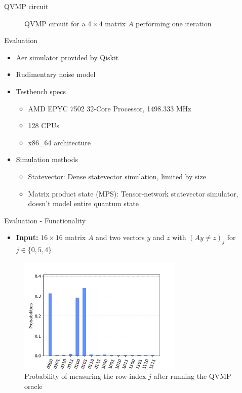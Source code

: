 \documentclass[10pt]{beamer}
\begin{document}
\begin{frame}{QVMP circuit}
  \begin{figure}
    \centering
    \scalebox{0.7}{}
    \caption{QVMP circuit for a $4 \times 4$ matrix $A$ performing one iteration}
    \label{fig:qvmp_oracle}
  \end{figure}
\end{frame}


\begin{frame}{Evaluation}
  \begin{itemize}
    \item Aer simulator provided by Qiskit
    \item Rudimentary noise model
    \item {
        Testbench specs
        \begin{itemize}
          \item AMD EPYC 7502 32-Core Processor, 1498.333 MHz
          \item 128 CPUs
          \item x86\_64 architecture
        \end{itemize}
    }
    \item {
        Simulation methods
        \begin{itemize}
          \item Statevector: Dense statevector simulation, limited by size
          \item Matrix product state (MPS): Tensor-network statevector simulator,
            doesn't model entire quantum state
        \end{itemize}
    }
  \end{itemize}
\end{frame}


\begin{frame}{Evaluation - Functionality}
  \begin{itemize}
    \item \textbf{Input:} $16 \times 16$ matrix $A$ and two vectors $y$ and $z$
      with $(Ay \neq z)_j$ for $j \in \{0, 5, 4\}$
  \end{itemize}
  \begin{figure}
    \centering
    \includegraphics[width=0.7\textwidth]{assets/16x16-simulation.png}
    \caption{Probability of measuring the row-index $j$ after running the QVMP
    oracle}
    \label{fig:qvmp_oracle_sample_execution}
  \end{figure}
\end{frame}
\end{document}

